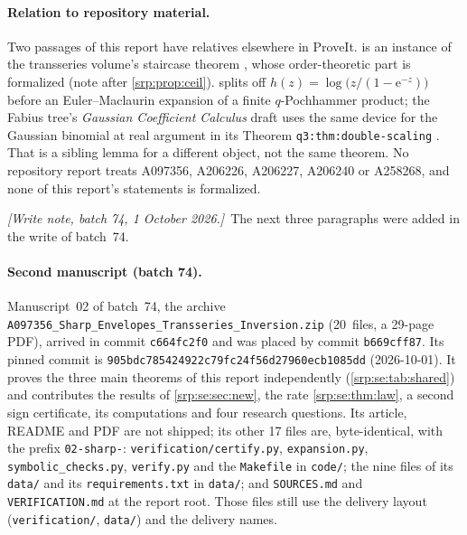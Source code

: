 \documentclass[11pt,a4paper]{article}
\numberwithin{equation}{section}
\theoremstyle{definition}
\theoremstyle{remark}
\newcommand{\e}{\mathrm e}
\newcommand{\writenotefour}[1]{\par\smallskip\noindent
 \textit{[Write note, batch 74, 1 October 2026.]}\ #1\par\smallskip}
\begin{document}
\paragraph{Relation to repository material.} Two passages of this report
have relatives elsewhere in ProveIt.  is an instance
of the transseries volume's staircase theorem \cite{proveitTI}, whose
order-theoretic part is formalized \cite{proveitLean} (note after
\cref{srp:prop:ceil}).  splits off
$h(z)=\log\bigl(z/(1-\e^{-z})\bigr)$ before an Euler--Maclaurin
expansion of a finite $q$-Pochhammer product; the Fabius tree's
\emph{Gaussian Coefficient Calculus} draft uses the same device for the
Gaussian binomial at real argument in its Theorem
\texttt{q3:thm:double-scaling} \cite{proveitGCC}. That is a sibling
lemma for a different object, not the same theorem. No repository
report treats A097356, A206226, A206227, A206240 or A258268, and none
of this report's statements is formalized.

\writenotefour{The next three paragraphs were added in the write of
batch~74.}

\paragraph{Second manuscript (batch 74).} Manuscript~02 of batch~74, the archive
\nolinkurl{A097356_Sharp_Envelopes_Transseries_Inversion.zip} (20~files,
a 29-page PDF), arrived in commit \texttt{c664fc2f0} and was placed by
commit \texttt{b669cff87}. Its pinned commit is
\nolinkurl{905bdc785424922c79fc24f56d27960ecb1085dd} (2026-10-01). It
proves the three main theorems of this report independently
(\cref{srp:se:tab:shared}) and contributes the results of
\cref{srp:se:sec:new}, the rate \cref{srp:se:thm:law}, a second sign
certificate, its computations and four research questions. Its article,
README and PDF are not shipped; its other 17 files are, byte-identical,
with the prefix \texttt{02-sharp-}: \texttt{verification/certify.py},
\texttt{expansion.py}, \texttt{symbolic\_checks.py}, \texttt{verify.py}
and the \texttt{Makefile} in \texttt{code/}; the nine files of its
\texttt{data/} and its \texttt{requirements.txt} in \texttt{data/}; and
\texttt{SOURCES.md} and \texttt{VERIFICATION.md} at the report root. Those
files still use the delivery layout (\texttt{verification/},
\texttt{data/}) and the delivery names.
\end{document}
